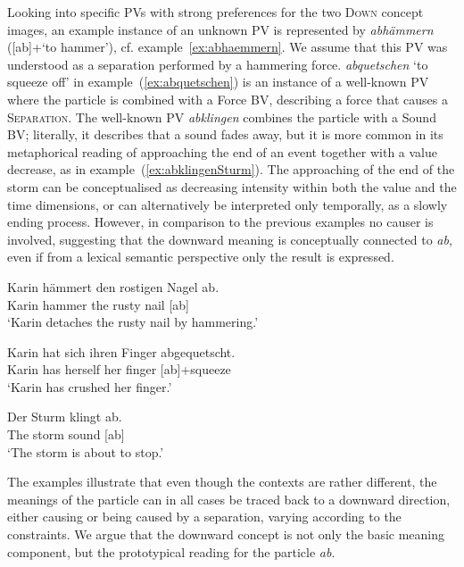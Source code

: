 \documentclass[output=paper]{langsci/langscibook}
\begin{document}
Looking into specific PVs with strong preferences for the two
\textsc{Down} concept images, an example instance of an unknown PV is represented
by \textit{abhämmern} ([ab]+`to hammer'),
cf. example~\ref{ex:abhaemmern}. We assume that this PV was understood
as a separation performed by a hammering force. \textit{abquetschen}
`to squeeze off' in example~(\ref{ex:abquetschen}) is an instance of
a well-known PV where the particle is combined with a Force
BV, describing a force that causes a \textsc{Separation}. The
well-known PV \textit{abklingen} combines the particle with a
Sound BV; literally, it describes that a sound fades away,
but it is more common in its metaphorical reading of approaching the
end of an event together with a value decrease, as in
example~(\ref{ex:abklingenSturm}). The approaching of the end of the
storm can be conceptualised as decreasing intensity within both the
value and the time dimensions, or can alternatively be interpreted
only temporally, as a slowly ending process. However, in comparison to
the previous examples no causer is involved, suggesting that the
downward meaning is conceptually connected to \textit{ab}, even if
from a lexical semantic perspective only the result is expressed.

\ea\label{ex:abhaemmern}
\gll Karin hämmert den rostigen Nagel ab.\\
Karin hammer the rusty nail [ab]\\
\glt `Karin detaches the rusty nail by hammering.'
\z


\ea\label{ex:abquetschen}
\gll Karin hat sich ihren Finger abgequetscht.\\
Karin has herself her finger [ab]+squeeze\\
\glt `Karin has crushed her finger.'
\z

\ea \label{ex:abklingenSturm}
\gll Der Sturm klingt ab.\\
The storm sound [ab]\\
\glt `The storm is about to stop.'
\z

The examples illustrate that even though the contexts are rather
different, the meanings of the particle can in all cases be traced
back to a downward direction, either causing or being caused by a
separation, varying according to the constraints. We argue that the
downward concept is not only the basic meaning component, but the
prototypical reading for the particle \textit{ab}.
\end{document}
